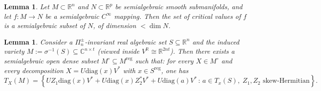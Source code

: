 \documentclass[11pt]{amsart}
\def\R{\mathbb R}\let\er\R
\def\C{\mathbb C}\let\ce\C
\theoremstyle{plain}
\newtheorem{lemma}[theorem]{Lemma}
\theoremstyle{definition}
\theoremstyle{remark}
\begin{document}
\begin{lemma}\label{as}\cite[Theorem~4.8]{costeSAG}
Let $M \subset \R^n$ and $N \subset \R^p$ be semialgebraic smooth submanifolds, and let
$f : M \to N$ be a semialgebraic $C^\infty$ mapping. Then the set of critical values of $f$
is a semialgebraic subset of $N$, of dimension $< \dim N$.
\end{lemma}



\begin{lemma}\label{tsM}
Consider a $\Pi_n^{\pm}$-invariant real algebraic set $S \subseteq \mathbb{R}^n$ and the induced variety
$M := \sigma^{-1}(S)\subseteq \C^{n\times t}$ (viewed inside $V^{\R}\cong \R^{2nt}$).
Then there exists a semialgebraic open dense subset $M^\circ\subseteq M^{\mathrm{reg}}$ such that:
for every $X\in M^\circ$ and every decomposition $X=U\mathrm{diag}(x)V^*$ with $x\in S^{\mathrm{reg}}$, one has
\[
T_{X}(M) = \left\{ UZ_1 \mathrm{diag}(x) V^{*} + U \mathrm{diag}(x) Z_2^{*} V^{*} + U \mathrm{diag}(a) V^{*}
\,:\, a \in T_{x}(S),\; Z_1, Z_2 \text{ skew-Hermitian} \right\}.
\]
\end{lemma}
\end{document}
